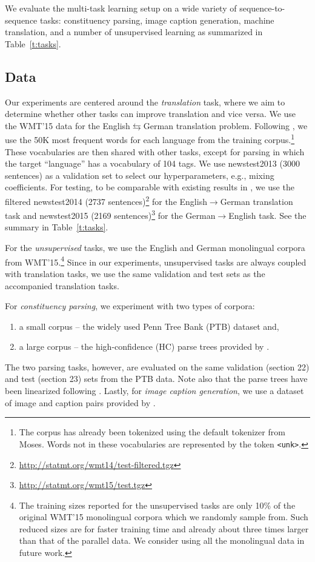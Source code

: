 We evaluate the multi-task learning setup on a wide variety of
sequence-to-sequence tasks: constituency parsing, image caption
generation, machine translation, and a number of unsupervised learning as
summarized in Table~\ref{t:tasks}.

\subsection{Data}
\label{subsec:data}
Our experiments are centered around the {\it translation} task, where we aim to determine 
whether other tasks can improve translation and vice versa. We use the WMT'15 data
\citep{bojar15} for the English$\leftrightarrows$German
translation problem. Following 
\citet{luong15attn}, we use the 50K most frequent words for each
language from the training corpus.\footnote{The corpus has already been tokenized using the default
tokenizer from Moses.  Words not in these vocabularies are represented by the token
\texttt{<unk>}.} These vocabularies are then shared with other tasks, except for
parsing in which the target ``language'' has a vocabulary of 104 tags. 
We use newstest2013 (3000 sentences) as a validation set to select our
hyperparameters, e.g., mixing coefficients. For testing, to be comparable with existing results in
\citep{luong15attn}, we use the filtered
newstest2014 (2737
sentences)\footnote{\url{http://statmt.org/wmt14/test-filtered.tgz}} for the
English$\rightarrow$German translation task and newstest2015 (2169
sentences)\footnote{\url{http://statmt.org/wmt15/test.tgz}}
for the German$\rightarrow$English task.
See the summary in Table~\ref{t:tasks}.

For the {\it unsupervised} tasks, we use the English and German monolingual corpora
from WMT'15.\footnote{The training sizes reported for
the unsupervised tasks are
only 10\% of
the original WMT'15 monolingual corpora which we randomly sample from. Such reduced sizes are
for faster training time and already about three times larger than that of the parallel
data. We consider using all the monolingual data in future work.} Since in
our experiments, unsupervised tasks are always coupled with translation tasks,
we use the same validation and test sets as the accompanied translation tasks.

For {\it constituency parsing}, we experiment with two types of corpora:
\begin{enumerate}
\item a small corpus -- the widely used
Penn Tree Bank (PTB) dataset \citep{Marcus:1993:BLA} and,
\item a large corpus -- the high-confidence (HC) parse trees 
provided by \citet{vinyals15grammar}.
\end{enumerate}
The two parsing tasks, however, are evaluated on the same validation (section
22) and test (section 23)
sets from the PTB data. Note also that the parse trees have been linearized
following \citet{vinyals15grammar}. 
Lastly, for {\it image caption generation}, we use a dataset of image and caption pairs provided by
\citet{vinyals15caption}.


